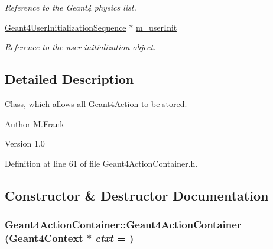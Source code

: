 \begin{DoxyCompactItemize}
\begin{DoxyCompactList}\small\item\em Reference to the Geant4 physics list. \item\end{DoxyCompactList}\item 
\hyperlink{class_d_d4hep_1_1_simulation_1_1_geant4_user_initialization_sequence}{Geant4UserInitializationSequence} $\ast$ \hyperlink{class_d_d4hep_1_1_simulation_1_1_geant4_action_container_a921172979d5e4b7be0b166f47b67d6fd}{m\_\-userInit}
\begin{DoxyCompactList}\small\item\em Reference to the user initialization object. \item\end{DoxyCompactList}\end{DoxyCompactItemize}


\subsection{Detailed Description}
Class, which allows all \hyperlink{class_d_d4hep_1_1_simulation_1_1_geant4_action}{Geant4Action} to be stored. \begin{DoxyAuthor}{Author}
M.Frank 
\end{DoxyAuthor}
\begin{DoxyVersion}{Version}
1.0 
\end{DoxyVersion}


Definition at line 61 of file Geant4ActionContainer.h.

\subsection{Constructor \& Destructor Documentation}
\hypertarget{class_d_d4hep_1_1_simulation_1_1_geant4_action_container_aad45b121ff08648b1eaf84869ad33da7}{
\subsubsection[{Geant4ActionContainer}]{\setlength{\rightskip}{0pt plus 5cm}Geant4ActionContainer::Geant4ActionContainer ({\bf Geant4Context} $\ast$ {\em ctxt} = {})}}
\label{class_d_d4hep_1_1_simulation_1_1_geant4_action_container_aad45b121ff08648b1eaf84869ad33da7}


